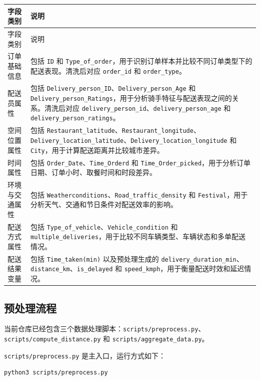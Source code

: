 \documentclass[UTF8, a4paper, 12pt, fontset=fandol]{ctexart}
\begin{document}
\begin{longtable}{p{3.2cm}p{10.8cm}}
\toprule
字段类别 & 说明 \\
\midrule
\endfirsthead
\toprule
字段类别 & 说明 \\
\midrule
\endhead
订单基础信息 & 包括 \texttt{ID} 和 \texttt{Type\_of\_order}，用于识别订单样本并比较不同订单类型下的配送表现。清洗后对应 \texttt{order\_id} 和 \texttt{order\_type}。 \\
配送员属性 & 包括 \texttt{Delivery\_person\_ID}、\texttt{Delivery\_person\_Age} 和 \texttt{Delivery\_person\_Ratings}，用于分析骑手特征与配送表现之间的关系。清洗后对应 \texttt{delivery\_person\_id}、\texttt{delivery\_person\_age} 和 \texttt{delivery\_person\_ratings}。 \\
空间位置属性 & 包括 \texttt{Restaurant\_latitude}、\texttt{Restaurant\_longitude}、\texttt{Delivery\_location\_latitude}、\texttt{Delivery\_location\_longitude} 和 \texttt{City}，用于计算配送距离并比较城市差异。 \\
时间属性 & 包括 \texttt{Order\_Date}、\texttt{Time\_Orderd} 和 \texttt{Time\_Order\_picked}，用于分析订单日期、订单小时、取餐时间和时段差异。 \\
环境与交通属性 & 包括 \texttt{Weatherconditions}、\texttt{Road\_traffic\_density} 和 \texttt{Festival}，用于分析天气、交通和节日条件对配送效率的影响。 \\
配送方式属性 & 包括 \texttt{Type\_of\_vehicle}、\texttt{Vehicle\_condition} 和 \texttt{multiple\_deliveries}，用于比较不同车辆类型、车辆状态和多单配送情况。 \\
配送结果变量 & 包括 \texttt{Time\_taken(min)} 以及预处理生成的 \texttt{delivery\_duration\_min}、\texttt{distance\_km}、\texttt{is\_delayed} 和 \texttt{speed\_kmph}，用于衡量配送时效和延迟情况。 \\
\bottomrule
\end{longtable}

\subsection{预处理流程}

当前仓库已经包含三个数据处理脚本：\texttt{scripts/preprocess.py}、\texttt{scripts/compute\_distance.py} 和 \texttt{scripts/aggregate\_data.py}。

\texttt{scripts/preprocess.py} 是主入口，运行方式如下：

\begin{verbatim}
python3 scripts/preprocess.py
\end{verbatim}
\end{document}
